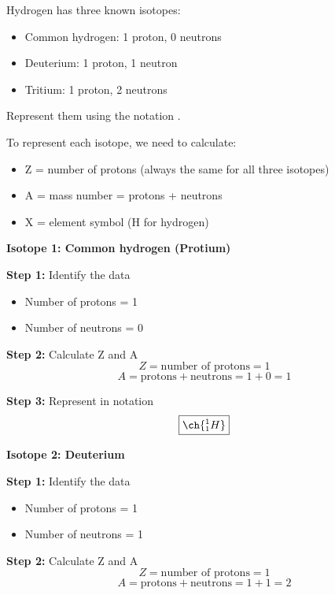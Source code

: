\begin{exercise}
    Hydrogen has three known isotopes:
    \begin{itemize}
        \item Common hydrogen: 1 proton, 0 neutrons
        \item Deuterium: 1 proton, 1 neutron
        \item Tritium: 1 proton, 2 neutrons
    \end{itemize}
    Represent them using the notation .
    \begin{solu}
        To represent each isotope, we need to calculate:
        \begin{itemize}
            \item Z = number of protons (always the same for all three isotopes)
            \item A = mass number = protons + neutrons
            \item X = element symbol (H for hydrogen)
        \end{itemize}

        \textbf{Isotope 1: Common hydrogen (Protium)}

        \textbf{Step 1:} Identify the data
        \begin{itemize}
            \item Number of protons = 1
            \item Number of neutrons = 0
        \end{itemize}

        \textbf{Step 2:} Calculate Z and A
        \[
            Z = \text{number of protons} = 1
        \]
        \[
            A = \text{protons} + \text{neutrons} = 1 + 0 = 1
        \]

        \textbf{Step 3:} Represent in notation
        \[
            \boxed{\ch{^{1}_{1}H}}
        \]

        \textbf{Isotope 2: Deuterium}

        \textbf{Step 1:} Identify the data
        \begin{itemize}
            \item Number of protons = 1
            \item Number of neutrons = 1
        \end{itemize}

        \textbf{Step 2:} Calculate Z and A
        \[
            Z = \text{number of protons} = 1
        \]
        \[
            A = \text{protons} + \text{neutrons} = 1 + 1 = 2
        \]


\end{solu}
\end{exercise}
